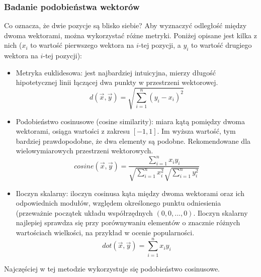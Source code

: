 \documentclass{article}
\begin{document}
\subsubsection{Badanie podobieństwa wektorów}
Co oznacza, że dwie pozycje są blisko siebie? Aby wyznaczyć odległość między dwoma wektorami, można wykorzystać różne metryki. Poniżej opisane jest kilka z nich ($x_i$ to wartość pierwszego wektora na $i$-tej pozycji, a $y_i$ to wartość drugiego wektora na $i$-tej pozycji):
\begin{itemize}
    \item Metryka euklidesowa: jest najbardziej intuicyjna, mierzy długość hipotetycznej linii łączącej dwa punkty w przestrzeni wektorowej. 
    \begin{equation}
        d(\vec{x}, \vec{y}) = \sqrt{\sum^n_{i = 1}{(y_i - x_i)^2}}
    \end{equation}
    \item Podobieństwo cosinusowe (cosine similarity): miara kątą pomiędzy dwoma wektorami, osiąga wartości z zakresu $[-1, 1]$. Im wyższa wartość, tym bardziej prawdopodobne, że dwa elementy są podobne. Rekomendowane dla wielowymiarowych przestrzeni wektorowych.
    \begin{equation}
        cosine(\vec{x}, \vec{y}) = \frac{\sum^n_{i = 1}{x_i y_i}}{\sqrt{\sum^n_{i = 1}{x_i^2}}\sqrt{\sum^n_{i = 1}{y_i^2}}}
    \end{equation}
    \item Iloczyn skalarny: iloczyn cosinusa kąta między dwoma wektorami oraz ich odpowiednich modułów, względem określonego punktu odniesienia (przeważnie początek układu współrzędnych $(0, 0, ..., 0)$. Iloczyn skalarny najlepiej sprawdza się przy porównywaniu elementów o znacznie różnych wartościach wielkości, na przykład w ocenie popularności. 
    \begin{equation}
        dot(\vec{x}, \vec{y}) = \sum^n_{i=1}{x_i y_i}
    \end{equation}
\end{itemize}
Najczęściej w tej metodzie wykorzystuje się podobieństwo cosinusowe. 
\end{document}
